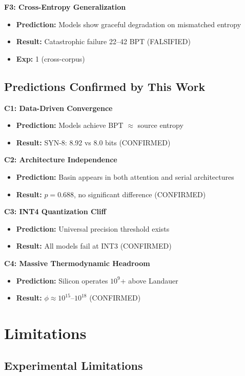 \documentclass[11pt,a4paper]{article}
\begin{document}
\textbf{F3: Cross-Entropy Generalization}
\begin{itemize}
\item \textbf{Prediction:} Models show graceful degradation on mismatched entropy
\item \textbf{Result:} Catastrophic failure 22--42 BPT (FALSIFIED)
\item \textbf{Exp:} 1 (cross-corpus)
\end{itemize}

\subsection{Predictions Confirmed by This Work}

\textbf{C1: Data-Driven Convergence}
\begin{itemize}
\item \textbf{Prediction:} Models achieve BPT $\approx$ source entropy
\item \textbf{Result:} SYN-8: 8.92 vs 8.0 bits (CONFIRMED)
\end{itemize}

\textbf{C2: Architecture Independence}
\begin{itemize}
\item \textbf{Prediction:} Basin appears in both attention and serial architectures
\item \textbf{Result:} $p = 0.688$, no significant difference (CONFIRMED)
\end{itemize}

\textbf{C3: INT4 Quantization Cliff}
\begin{itemize}
\item \textbf{Prediction:} Universal precision threshold exists
\item \textbf{Result:} All models fail at INT3 (CONFIRMED)
\end{itemize}

\textbf{C4: Massive Thermodynamic Headroom}
\begin{itemize}
\item \textbf{Prediction:} Silicon operates $10^9$+ above Landauer
\item \textbf{Result:} $\phi \approx 10^{15}$--$10^{18}$ (CONFIRMED)
\end{itemize}

\section{Limitations}

\subsection{Experimental Limitations}
\end{document}
